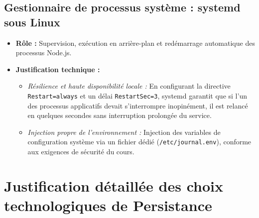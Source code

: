 \subsection{Gestionnaire de processus système : systemd sous Linux}
\begin{itemize}
    \item \textbf{Rôle :} Supervision, exécution en arrière-plan et redémarrage automatique des processus Node.js.
    \item \textbf{Justification technique :} 
    \begin{itemize}
        \item \emph{Résilience et haute disponibilité locale :} En configurant la directive \texttt{Restart=always} et un délai \texttt{RestartSec=3}, systemd garantit que si l'un des processus applicatifs devait s'interrompre inopinément, il est relancé en quelques secondes sans interruption prolongée du service.
        \item \emph{Injection propre de l'environnement :} Injection des variables de configuration système via un fichier dédié (\texttt{/etc/journal.env}), conforme aux exigences de sécurité du cours.
    \end{itemize}
\end{itemize}

\section{Justification détaillée des choix technologiques de Persistance}

